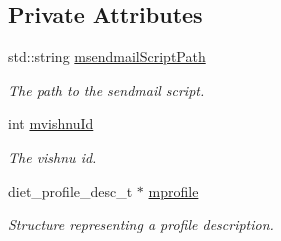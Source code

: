 \subsection*{Private Attributes}
\begin{DoxyCompactItemize}
\item 
\hypertarget{classServerUMS_afada4a5788f967573d0bebdd86fa27fc}{
std::string \hyperlink{classServerUMS_afada4a5788f967573d0bebdd86fa27fc}{msendmailScriptPath}}
\label{classServerUMS_afada4a5788f967573d0bebdd86fa27fc}

\begin{DoxyCompactList}\small\item\em The path to the sendmail script. \item\end{DoxyCompactList}\item 
\hypertarget{classServerUMS_aaa774476df0842c1c98bd03347c78f59}{
int \hyperlink{classServerUMS_aaa774476df0842c1c98bd03347c78f59}{mvishnuId}}
\label{classServerUMS_aaa774476df0842c1c98bd03347c78f59}

\begin{DoxyCompactList}\small\item\em The vishnu id. \item\end{DoxyCompactList}\item 
\hypertarget{classServerUMS_a6ef0b83c146414d0b277ebec2cb50747}{
diet\_\-profile\_\-desc\_\-t $\ast$ \hyperlink{classServerUMS_a6ef0b83c146414d0b277ebec2cb50747}{mprofile}}
\label{classServerUMS_a6ef0b83c146414d0b277ebec2cb50747}

\begin{DoxyCompactList}\small\item\em Structure representing a profile description. \item\end{DoxyCompactList}\end{DoxyCompactItemize}
